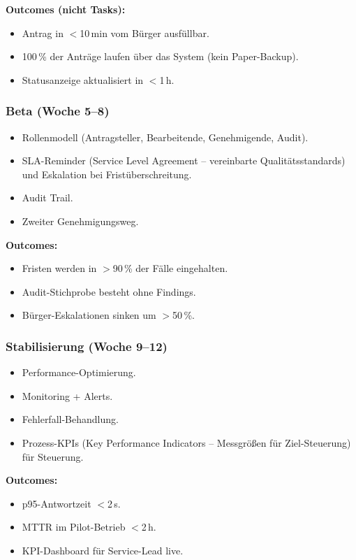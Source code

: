 \documentclass[11pt,a4paper,oneside]{article}
\begin{document}
\textbf{Outcomes (nicht Tasks):}
\begin{itemize}
  \item Antrag in $<$10\,min vom Bürger ausfüllbar.
  \item 100\,\% der Anträge laufen über das System (kein Paper-Backup).
  \item Statusanzeige aktualisiert in $<$1\,h.
\end{itemize}

\subsubsection{Beta (Woche 5--8)}

\begin{itemize}
  \item Rollenmodell (Antragsteller, Bearbeitende, Genehmigende, Audit).
  \item SLA-Reminder (Service Level Agreement -- vereinbarte Qualitätsstandards) und Eskalation bei Fristüberschreitung.
  \item Audit Trail.
  \item Zweiter Genehmigungsweg.
\end{itemize}

\textbf{Outcomes:}
\begin{itemize}
  \item Fristen werden in $>$90\,\% der Fälle eingehalten.
  \item Audit-Stichprobe besteht ohne Findings.
  \item Bürger-Eskalationen sinken um $>$50\,\%.
\end{itemize}

\subsubsection{Stabilisierung (Woche 9--12)}

\begin{itemize}
  \item Performance-Optimierung.
  \item Monitoring + Alerts.
  \item Fehlerfall-Behandlung.
  \item Prozess-KPIs (Key Performance Indicators -- Messgrößen für Ziel-Steuerung) für Steuerung.
\end{itemize}

\textbf{Outcomes:}
\begin{itemize}
  \item p95-Antwortzeit $<$2\,s.
  \item MTTR im Pilot-Betrieb $<$2\,h.
  \item KPI-Dashboard für Service-Lead live.
\end{itemize}
\end{document}
